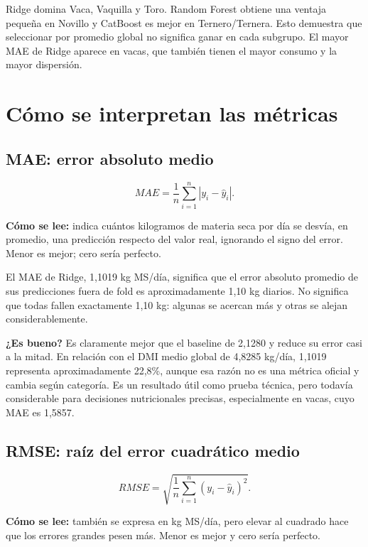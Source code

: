 \documentclass[11pt,a4paper]{article}
\begin{document}
Ridge domina Vaca, Vaquilla y Toro. Random Forest obtiene una ventaja pequeña en Novillo y CatBoost es mejor en Ternero/Ternera. Esto demuestra que seleccionar por promedio global no significa ganar en cada subgrupo. El mayor MAE de Ridge aparece en vacas, que también tienen el mayor consumo y la mayor dispersión.

\section{Cómo se interpretan las métricas}

\subsection{MAE: error absoluto medio}

\begin{equation}
MAE=\frac{1}{n}\sum_{i=1}^{n}|y_i-\hat y_i|.
\end{equation}

\textbf{Cómo se lee:} indica cuántos kilogramos de materia seca por día se desvía, en promedio, una predicción respecto del valor real, ignorando el signo del error. Menor es mejor; cero sería perfecto.

El MAE de Ridge, 1,1019 kg MS/día, significa que el error absoluto promedio de sus predicciones fuera de fold es aproximadamente 1,10 kg diarios. No significa que todas fallen exactamente 1,10 kg: algunas se acercan más y otras se alejan considerablemente.

\textbf{¿Es bueno?} Es claramente mejor que el baseline de 2,1280 y reduce su error casi a la mitad. En relación con el DMI medio global de 4,8285 kg/día, 1,1019 representa aproximadamente 22,8\%, aunque esa razón no es una métrica oficial y cambia según categoría. Es un resultado útil como prueba técnica, pero todavía considerable para decisiones nutricionales precisas, especialmente en vacas, cuyo MAE es 1,5857.

\subsection{RMSE: raíz del error cuadrático medio}

\begin{equation}
RMSE=\sqrt{\frac{1}{n}\sum_{i=1}^{n}(y_i-\hat y_i)^2}.
\end{equation}

\textbf{Cómo se lee:} también se expresa en kg MS/día, pero elevar al cuadrado hace que los errores grandes pesen más. Menor es mejor y cero sería perfecto.
\end{document}
